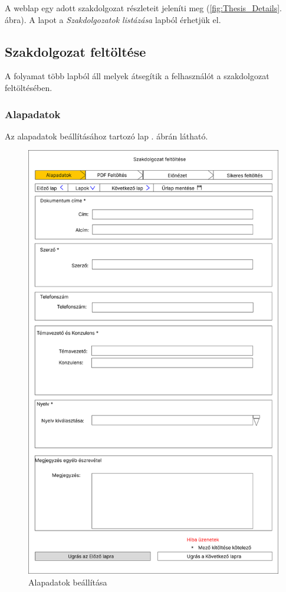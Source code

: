 \documentclass[a4paper,12pt]{article}
\begin{document}
A weblap egy adott szakdolgozat részleteit jeleníti meg (\ref{fig:Thesis_Details}. ábra). A lapot a \textit{Szakdolgozatok listázása} lapból érhetjük el. 

\subsection{Szakdolgozat feltöltése}

A folyamat több lapból áll melyek átsegítik a felhasználót a szakdolgozat feltöltésében.

\subsubsection{Alapadatok}

Az alapadatok beállításához tartozó lap . ábrán látható.

\begin{figure}[h!]
	\centering
	\includegraphics[scale=0.2]{images/Web_pages/Title_Settings.png}
	\caption{Alapadatok beállítása}
	\label{fig:Title_Settings}
\end{figure}
\end{document}
